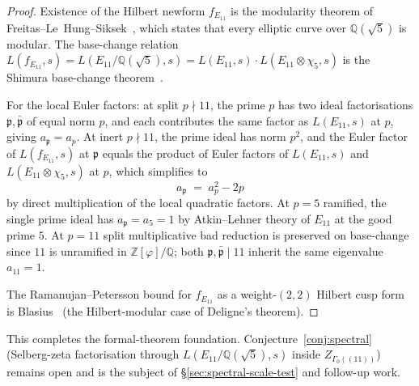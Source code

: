 \documentclass[11pt,a4paper]{article}
\theoremstyle{plain}
\theoremstyle{definition}
\theoremstyle{remark}
\numberwithin{equation}{section}
\providecommand{\Zp}{\ensuremath{\mathbb{Z}[\varphi]}}
\providecommand{\Qp}{\ensuremath{\mathbb{Q}(\sqrt{5})}}
\begin{document}
\begin{proof}
Existence of the Hilbert newform $f_{E_{11}}$ is the modularity theorem of
Freitas--Le~Hung--Siksek~\cite{FLHS2015}, which states that every elliptic curve
over $\Qp$ is modular.  The base-change relation
$L(f_{E_{11}},s)=L(E_{11}/\Qp,s)=L(E_{11},s)\cdot L(E_{11}\otimes\chi_{5},s)$
is the Shimura base-change theorem~\cite[\S 4]{ShimuraBaseChange}.

For the local Euler factors: at split $p\nmid 11$, the prime $p$ has two ideal
factorisations $\mathfrak p,\bar{\mathfrak p}$ of equal norm $p$, and each
contributes the same factor as $L(E_{11},s)$ at $p$, giving $a_{\mathfrak p}=a_{p}$.
At inert $p\nmid 11$, the prime ideal has norm $p^{2}$, and the Euler factor
of $L(f_{E_{11}},s)$ at $\mathfrak p$ equals the product of Euler factors of
$L(E_{11},s)$ and $L(E_{11}\otimes\chi_{5},s)$ at $p$, which simplifies to
\[
  a_{\mathfrak p} \;=\; a_{p}^{2}-2p
\]
by direct multiplication of the local quadratic factors.  At $p=5$ ramified,
the single prime ideal has $a_{\mathfrak p}=a_{5}=1$ by Atkin--Lehner theory
of $E_{11}$ at the good prime $5$.  At $p=11$ split multiplicative bad
reduction is preserved on base-change since $11$ is unramified in $\Zp/\mathbb Q$;
both $\mathfrak p,\bar{\mathfrak p}\mid 11$ inherit the same eigenvalue $a_{11}=1$.

The Ramanujan--Petersson bound for $f_{E_{11}}$ as a weight-$(2,2)$ Hilbert cusp
form is Blasius~\cite{Blasius} (the Hilbert-modular case of Deligne's theorem).
\end{proof}

This completes the formal-theorem foundation.  Conjecture~\ref{conj:spectral}
(Selberg-zeta factorisation through $L(E_{11}/\Qp,s)$ inside $Z_{\Gamma_{0}((11))}$)
remains open and is the subject of \S\ref{sec:spectral-scale-test} and
follow-up work.
\end{document}

